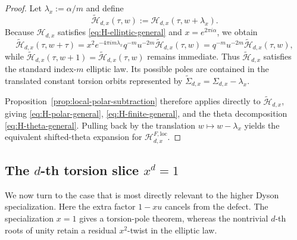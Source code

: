 \documentclass[12pt]{amsart}
\numberwithin{equation}{section}
\begin{document}
\begin{proof}
Let $\lambda_x:=\alpha/m$ and define
\[
\widetilde{\mathcal H}_{d,x}(\tau,w):=\mathcal H_{d,x}(\tau,w+\lambda_x).
\]
Because $\mathcal H_{d,x}$ satisfies \eqref{eq:H-elliptic-general} and $x=e^{2\pi i\alpha}$, we obtain
\[
\widetilde{\mathcal H}_{d,x}(\tau,w+\tau)
=
x^2e^{-4\pi i m\lambda_x}q^{-m}u^{-2m}\widetilde{\mathcal H}_{d,x}(\tau,w)
=
q^{-m}u^{-2m}\widetilde{\mathcal H}_{d,x}(\tau,w),
\]
while $\widetilde{\mathcal H}_{d,x}(\tau,w+1)=\widetilde{\mathcal H}_{d,x}(\tau,w)$ remains immediate.  Thus $\widetilde{\mathcal H}_{d,x}$ satisfies the standard index-$m$ elliptic law.  Its possible poles are contained in the translated constant torsion orbits represented by $\widetilde\Sigma_{d,x}=\Sigma_{d,x}-\lambda_x$.

Proposition~\ref{prop:local-polar-subtraction} therefore applies directly to $\widetilde{\mathcal H}_{d,x}$, giving \eqref{eq:H-polar-general}, \eqref{eq:H-finite-general}, and the theta decomposition \eqref{eq:H-theta-general}.  Pulling back by the translation $w\mapsto w-\lambda_x$ yields the equivalent shifted-theta expansion for $\mathcal H_{d,x}^{F,\mathrm{loc}}$.
\end{proof}

\subsection[The d-th torsion slice x to the d equals 1]{\texorpdfstring{The $d$-th torsion slice $x^d=1$}{The d-th torsion slice x to the d equals 1}}

We now turn to the case that is most directly relevant to the higher Dyson specialization.  Here the extra factor $1-xu$ cancels from the defect.  The specialization $x=1$ gives a  torsion-pole theorem, whereas the nontrivial $d$-th roots of unity retain a residual $x^2$-twist in the elliptic law.
\end{document}
